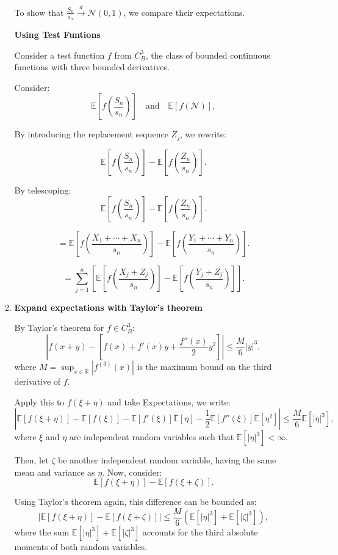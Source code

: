 \begin{itemize}
\begin{enumerate}
To show that \( \frac{S_n}{s_n} \xrightarrow{d} \mathcal{N}(0, 1) \), we compare their expectations. 

\textbf{Using Test Funtions}

Consider a test function \( f \) from \( C^3_B \), the class of bounded continuous functions with three bounded derivatives.

Consider:
\[
\mathbb{E}\left[f\left(\frac{S_n}{s_n}\right)\right] \quad \text{and} \quad \mathbb{E}\left[f\left(\mathcal{N}\right)\right],
\]

By introducing the replacement sequence \( Z_j \), we rewrite:

\[
\mathbb{E}\left[f\left(\frac{S_n}{s_n}\right)\right] - \mathbb{E}\left[f\left(\frac{Z_n}{s_n}\right)\right].
\]

By telescoping:
\[
\mathbb{E}\left[f\left(\frac{S_n}{s_n}\right)\right] - \mathbb{E}\left[f\left(\frac{Z_n}{s_n}\right)\right].
\]

\[
= \mathbb{E}\left[f\left(\frac{X_1 + \cdots + X_n}{s_n}\right)\right] - \mathbb{E}\left[f\left(\frac{Y_1 + \cdots + Y_n}{s_n}\right)\right].
\]

\[
= \sum_{j=1}^n \left[\mathbb{E}\left[f\left(\frac{X_j + Z_j}{s_n}\right)\right] - \mathbb{E}\left[f\left(\frac{Y_j + Z_j}{s_n}\right)\right]\right].
\]

\item \textbf{Expand expectations with Taylor’s theorem}

By Taylor's theorem for \( f \in C^3_B \):
\[
\left|f(x + y) - \left[f(x) + f'(x)y + \frac{f''(x)}{2}y^2\right]\right| \leq \frac{M}{6}|y|^3,
\]
where \( M = \sup_{x \in \mathbb{R}} |f^{(3)}(x)| \) is the maximum bound on the third derivative of \( f \).

Apply this to \( f(\xi + \eta) \) and take Expectations, we write:
\[
\left| \mathbb{E}[f(\xi + \eta)] - \mathbb{E}[f(\xi)] - \mathbb{E}[f'(\xi)]\mathbb{E}[\eta] - \frac{1}{2}\mathbb{E}[f''(\xi)]\mathbb{E}[\eta^2] \right| \leq \frac{M}{6} \mathbb{E}[|\eta|^3],
\]
where \( \xi \) and \( \eta \) are independent random variables such that \(\mathbb{E}[|\eta|^3] < \infty \).

Then, let \( \zeta \) be another independent random variable, having the same mean and variance as \( \eta \). Now, consider:
     \[
     \mathbb{E}[f(\xi + \eta)] - \mathbb{E}[f(\xi + \zeta)].
     \]
     
Using Taylor's theorem again, this difference can be bounded as:
     \[
     \left| \mathbb{E}[f(\xi + \eta)] - \mathbb{E}[f(\xi + \zeta)] \right| \leq \frac{M}{6} (\mathbb{E}[|\eta|^3] + \mathbb{E}[|\zeta|^3]),
     \]
     where the sum \( \mathbb{E}[|\eta|^3] + \mathbb{E}[|\zeta|^3] \) accounts for the third absolute moments of both random variables.


\end{enumerate}
\end{itemize}
